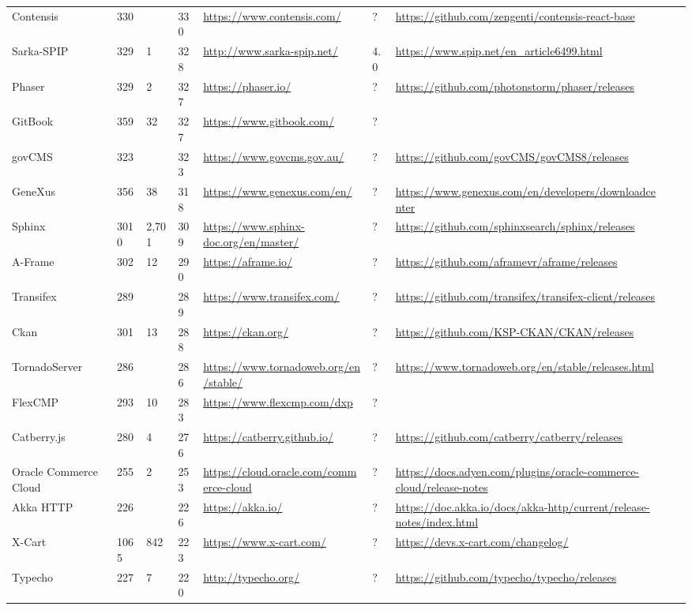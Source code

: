 \begin{table}[!htp]
\begin{tabular}{|l|l|l|l|l|l|l|l|l|}
				Contensis &330 & &330 &\ul{https://www.contensis.com/} &? &\ul{https://github.com/zengenti/contensis-react-base} & \\
				Sarka-SPIP &329 &1 &328 &\ul{http://www.sarka-spip.net/} &4.0 &\ul{https://www.spip.net/en\_article6499.html} & \\
				Phaser &329 &2 &327 &\ul{https://phaser.io/} &? &\ul{https://github.com/photonstorm/phaser/releases} & \\
				GitBook &359 &32 &327 &\ul{https://www.gitbook.com/} &? & & \\
				govCMS &323 & &323 &\ul{https://www.govcms.gov.au/} &? &\ul{https://github.com/govCMS/govCMS8/releases} & \\
				GeneXus &356 &38 &318 &\ul{https://www.genexus.com/en/} &? &\ul{https://www.genexus.com/en/developers/downloadcenter} & \\
				Sphinx &3010 &2,701 &309 &\ul{https://www.sphinx-doc.org/en/master/} &? &\ul{https://github.com/sphinxsearch/sphinx/releases} & \\
				A-Frame &302 &12 &290 &\ul{https://aframe.io/} &? &\ul{https://github.com/aframevr/aframe/releases} & \\
				Transifex &289 & &289 &\ul{https://www.transifex.com/} &? &\ul{https://github.com/transifex/transifex-client/releases} & \\
				Ckan &301 &13 &288 &\ul{https://ckan.org/} &? &\ul{https://github.com/KSP-CKAN/CKAN/releases} & \\
				TornadoServer &286 & &286 &\ul{https://www.tornadoweb.org/en/stable/} &? &\ul{https://www.tornadoweb.org/en/stable/releases.html} & \\
				FlexCMP &293 &10 &283 &\ul{https://www.flexcmp.com/dxp} &? & & \\
				Catberry.js &280 &4 &276 &\ul{https://catberry.github.io/} &? &\ul{https://github.com/catberry/catberry/releases} & \\
				Oracle Commerce Cloud &255 &2 &253 &\ul{https://cloud.oracle.com/commerce-cloud} &? &\ul{https://docs.adyen.com/plugins/oracle-commerce-cloud/release-notes} & \\
				Akka HTTP &226 & &226 &\ul{https://akka.io/} &? &\ul{https://doc.akka.io/docs/akka-http/current/release-notes/index.html} & \\
				X-Cart &1065 &842 &223 &\ul{https://www.x-cart.com/} &? &\ul{https://devs.x-cart.com/changelog/} & \\
				Typecho &227 &7 &220 &\ul{http://typecho.org/} &? &\ul{https://github.com/typecho/typecho/releases} & \\

\end{tabular}
\end{table}
